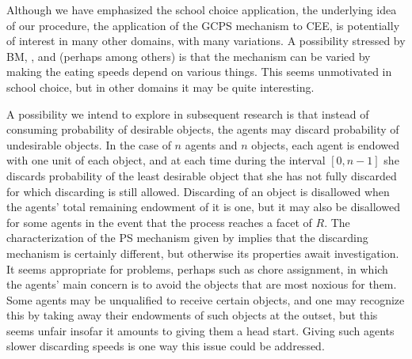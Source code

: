 \documentclass[12pt]{article}
\theoremstyle{definition}
\begin{document}
Although we have emphasized the school choice application, the underlying idea of our procedure, the application of the GCPS mechanism to CEE, is potentially of interest in many other domains, with many variations.  A possibility stressed by BM, \cite{cho18scw}, and \cite{balbuzanov22jet} (perhaps among others) is that the mechanism can be varied by making the eating speeds depend on various things.  This seems unmotivated in school choice, but in other domains it may be quite interesting.

A possibility we intend to explore in subsequent research is that instead of consuming probability of desirable objects, the agents may discard probability of undesirable objects.  In the case of $n$ agents and $n$ objects, each agent is endowed with one unit of each object, and at each time during the interval $[0,n-1]$ she discards probability of the least desirable object that she has not fully discarded for which discarding is still allowed.  Discarding of an object is disallowed when the agents' total remaining endowment of it is one, but it may also be disallowed for some agents in the event that the process reaches a facet of $R$.  The characterization of the PS mechanism given by \cite{bh12} implies that the discarding mechanism is certainly different, but otherwise its properties await investigation.  It seems appropriate for problems, perhaps such as chore assignment, in which the agents' main concern is to avoid the objects that are most noxious for them.  Some agents may be unqualified to receive certain objects, and one may recognize this by taking away their endowments of such objects at the outset, but this seems unfair insofar it amounts to giving them a head start.  Giving such agents slower discarding speeds is one way this issue could be addressed.
\end{document}

